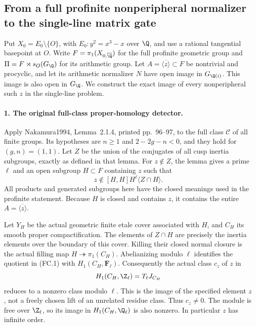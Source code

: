 \subsection*{From a full profinite nonperipheral normalizer to the single-line matrix gate}

Put $X_0=E_0\setminus\{O\}$, with
$E_0:y^2=x^3-x$ over $\Q$, and use a rational tangential
basepoint at $O$. Write $F=\pi_1(X_{0,\overline\Q})$ for
the full profinite geometric group and
$\Pi=F\rtimes s_O(G_\Q)$ for its arithmetic group.
Let $A=\overline{\langle z\rangle}\subset F$ be nontrivial
and procyclic, and let its arithmetic normalizer $N$
have open image in $G_{\Q(i)}$. This image is also open
in $G_\Q$. We construct the exact image of every
nonperipheral such $z$ in the single-line problem.

\paragraph{1. The original full-class proper-homology detector.}
Apply Nakamura1994, Lemma~2.1.4, printed pp.~96--97,
to the full class $\mathcal C$ of all finite groups\cite{AuditNakamura1994}.
Its hypotheses are $n\geq1$ and $2-2g-n<0$, and they
hold for $(g,n)=(1,1)$. Let $Z$ be the union of the
conjugates of all cusp inertia subgroups, exactly as
defined in that lemma. For $z\notin Z$, the lemma gives
a prime $\ell$ and an open subgroup $H\subset F$
containing $z$ such that
\[
             z\notin [H,H]H^\ell\langle Z\cap H\rangle .    \tag{FC.1}
\]
All products and generated subgroups here have the
closed meanings used in the profinite statement.
Because $H$ is closed and contains $z$, it contains
the entire $A=\overline{\langle z\rangle}$.

Let $Y_H$ be the actual geometric finite etale cover
associated with $H$, and $C_H$ its smooth proper
compactification. The elements of $Z\cap H$ are
precisely the inertia elements over the boundary
of this cover. Killing their closed normal closure
is the actual filling map
$H\twoheadrightarrow\pi_1(C_H)$. Abelianizing modulo
$\ell$ identifies the quotient in (FC.1) with
$H_1(C_H,\mathbf F_\ell)$. Consequently the actual
class $c_z$ of $z$ in
\[
                    H_1(C_H,\Z_\ell)=T_\ell J_{C_H}
\]
reduces to a nonzero class modulo $\ell$.
This is the image of the specified element $z$,
not a freely chosen lift of an unrelated residue
class. Thus $c_z\ne0$. The module is free over
$\Z_\ell$, so its image in
$H_1(C_H,\Q_\ell)$ is also nonzero.
In particular $z$ has infinite order.

